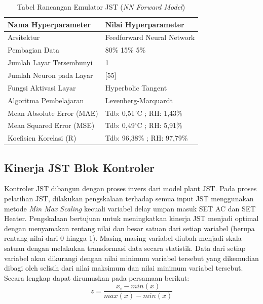 \begin{table}[!hbt]
	\caption{Tabel Rancangan Emulator JST (\textit{NN Forward Model})}
	\label{tbl:5:NNEmulator}
	\centering
	\begin{tabular}{|p{5.7cm}|p{5cm}|}
		\hline
		\textbf{Nama Hyperparameter} & \textbf{Nilai Hyperparameter} \\ \hline
		Arsitektur & Feedforward Neural Network \\ \hline
		Pembagian Data & 80\% 15\% 5\% \\ \hline 
		Jumlah Layar Tersembunyi & 1 \\ \hline
		Jumlah Neuron pada Layar & [55] \\ \hline
		Fungsi Aktivasi Layar & Hyperbolic Tangent \\ \hline
		Algoritma Pembelajaran & Levenberg-Marquardt \\ \hline
		Mean Absolute Error (MAE) & Tdb: 0,51$^\circ$C ; RH: 1,43\% \\ \hline
		Mean Squared Error (MSE) & Tdb: 0,49$^\circ$C ; RH: 5,91\% \\ \hline
		Koefisien Korelasi (R) & Tdb: 96,38\% ; RH: 97,79\% \\ \hline
	\end{tabular}
\end{table}

\subsection{Kinerja JST Blok Kontroler}

Kontroler JST dibangun dengan proses invers dari model plant JST. Pada proses pelatihan JST, dilakukan pengskalaan terhadap semua input JST menggunakan metode \textit{Min Max Scaling} kecuali variabel delay umpan masuk SET AC dan SET Heater. Pengskalaan bertujuan untuk meningkatkan kinerja JST menjadi optimal dengan menyamakan rentang nilai dan besar satuan dari setiap variabel (berupa rentang nilai dari 0 hingga 1). Masing-masing variabel diubah menjadi skala satuan dengan melakukan transformasi data secara statistik. Data dari setiap variabel akan dikurangi dengan nilai minimum variabel tersebut yang dikemudian dibagi oleh selisih dari nilai maksimum dan nilai minimum variabel tersebut. Secara lengkap dapat dirumuskan pada persamaan berikut:
\begin{equation} \label{eq:5:MinMaxScaler}
z = \frac{x_i - min(x)}{max(x) - min(x)}
\end{equation}

